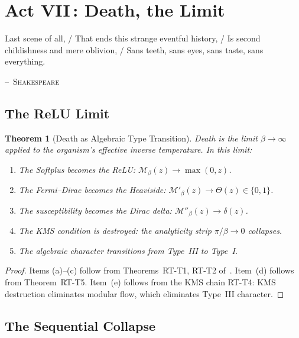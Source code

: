 \documentclass[12pt, letterpaper]{article}
\theoremstyle{plain}
\newtheorem{theorem}{Theorem}[section]
\theoremstyle{definition}
\theoremstyle{remark}
\newcommand{\Mop}{\mathcal{M}}            %
\begin{document}
\section{\texorpdfstring{Act VII\,: Death, the Limit}{Act VII: Death, the Limit}}
\label{sec:act7}

\epigraph{Last scene of all, / That ends this strange eventful history, / Is second childishness and mere oblivion, / Sans teeth, sans eyes, sans taste, sans everything.}{\textsc{--~Shakespeare}}

\subsection{The ReLU Limit}

\begin{theorem}[Death as Algebraic Type Transition]\label{thm:death}
  Death is the limit $\beta \to \infty$ applied to the organism's effective inverse temperature. In this limit:
  \begin{enumerate}[label=(\alph*)]
    \item The Softplus becomes the ReLU: $\Mop_\beta(z) \to \max(0, z)$.
    \item The Fermi--Dirac becomes the Heaviside: $\Mop'_\beta(z) \to \Theta(z) \in \{0, 1\}$.
    \item The susceptibility becomes the Dirac delta: $\Mop''_\beta(z) \to \delta(z)$.
    \item The KMS condition is destroyed: the analyticity strip $\pi/\beta \to 0$ collapses.
    \item The algebraic character transitions from Type~III to Type~I.
  \end{enumerate}
\end{theorem}

\begin{proof}
  Items (a)--(c) follow from Theorems~RT-T1, RT-T2 of~\cite{RT}. Item~(d) follows from Theorem~RT-T5. Item~(e) follows from the KMS chain RT-T4: KMS destruction eliminates modular flow, which eliminates Type~III character.
\end{proof}

\subsection{The Sequential Collapse}
\end{document}
